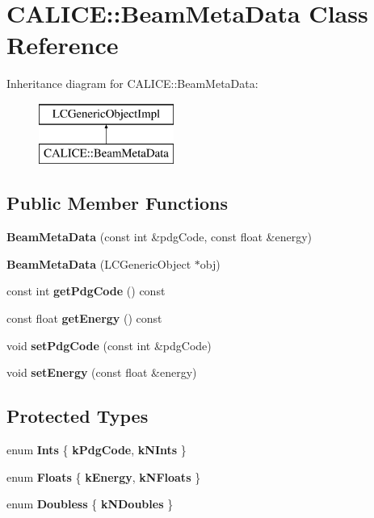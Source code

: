 \section{C\-A\-L\-I\-C\-E\-:\-:Beam\-Meta\-Data Class Reference}
\label{classCALICE_1_1BeamMetaData}
Inheritance diagram for C\-A\-L\-I\-C\-E\-:\-:Beam\-Meta\-Data\-:\begin{figure}[H]
\begin{center}
\leavevmode
\includegraphics[height=2.000000cm]{classCALICE_1_1BeamMetaData}
\end{center}
\end{figure}
\subsection*{Public Member Functions}
\begin{DoxyCompactItemize}
\item 
{\bfseries Beam\-Meta\-Data} (const int \&pdg\-Code, const float \&energy)\label{classCALICE_1_1BeamMetaData_ac22d51f9f4ac31beae53b0ace01fafd0}

\item 
{\bfseries Beam\-Meta\-Data} (L\-C\-Generic\-Object $\ast$obj)\label{classCALICE_1_1BeamMetaData_ac0f69e98cee9d162ba93f5620d1e05e6}

\item 
const int {\bfseries get\-Pdg\-Code} () const \label{classCALICE_1_1BeamMetaData_a71fc431fc1c25ca0d310a8a3980c4656}

\item 
const float {\bfseries get\-Energy} () const \label{classCALICE_1_1BeamMetaData_a7b6054aeeeee3ad83f468466f7835c7e}

\item 
void {\bfseries set\-Pdg\-Code} (const int \&pdg\-Code)\label{classCALICE_1_1BeamMetaData_a73a59e54ded8ad2f88f1ce894d56cef2}

\item 
void {\bfseries set\-Energy} (const float \&energy)\label{classCALICE_1_1BeamMetaData_a72048e8487e9c9711cc0edf98367a7fd}

\end{DoxyCompactItemize}
\subsection*{Protected Types}
\begin{DoxyCompactItemize}
\item 
enum {\bfseries Ints} \{ {\bfseries k\-Pdg\-Code}, 
{\bfseries k\-N\-Ints}
 \}
\item 
enum {\bfseries Floats} \{ {\bfseries k\-Energy}, 
{\bfseries k\-N\-Floats}
 \}
\item 
enum {\bfseries Doubless} \{ {\bfseries k\-N\-Doubles}
 \}
\end{DoxyCompactItemize}
